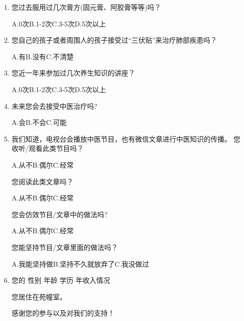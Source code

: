 \begin{enumerate}
A.草药煎汤\qquad B.贴敷的膏药\qquad C.物理疗法,比如针灸,拔火罐等\qquad D.填写\underline{\makebox[6em]{}}

\item 您过去服用过几次膏方(固元膏、阿胶膏等等)吗？

A.0次\qquad B.1-2次\qquad C.3-5次\qquad D.5次以上

\item 您自己的孩子或者周围人的孩子接受过“三伏贴”来治疗肺部疾患吗？

A.有\qquad B.没有\qquad C.不清楚

\item 
您近一年来参加过几次养生知识的讲座？

A.0次\qquad B.1-2次\qquad C.3-5次\qquad D.5次以上

\item 
未来您会去接受中医治疗吗?

A.会\qquad B.不会\qquad C.可能 

\item 
我们知道，电视台会播放中医节目，也有微信文章进行中医知识的传播。
\subitem 
   您收听/观看此类节目吗？
   
    A.从不\qquad B.偶尔\qquad C.经常

	\subitem 
    您阅读此类文章吗？
	
    A.从不\qquad B.偶尔\qquad C.经常
    
    \subitem 
    您会仿效节目/文章中的做法吗?
	
	A.从不\qquad B.偶尔\qquad C.经常
    
    \subitem 
   您能坚持节目/文章里面的做法吗？
   
    A.我能坚持做\qquad B.坚持不久就放弃了\qquad C.我没做过
    
\item 
您的
性别\underline{\makebox[6em]{}}
年龄\underline{\makebox[6em]{}}
学历\underline{\makebox[6em]{}}
年收入情况\underline{\makebox[6em]{}}

您居住在\underline{\makebox[3em]{}}苑\underline{\makebox[2em]{}}幢\underline{\makebox[2em]{}}室。

感谢您的参与以及对我们的支持！
\end{enumerate}
